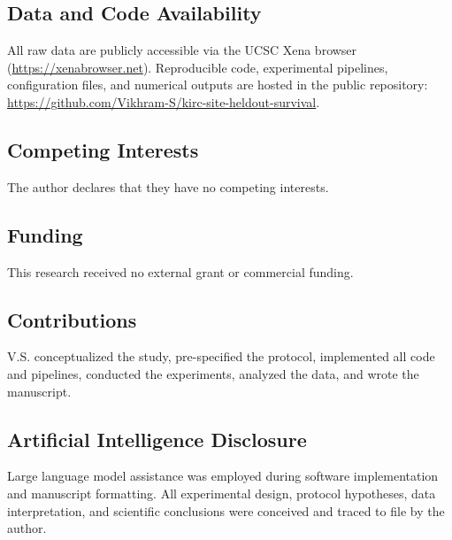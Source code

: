 \documentclass{article}
\begin{document}
\subsection*{Data and Code Availability}
All raw data are publicly accessible via the UCSC Xena browser (\url{https://xenabrowser.net}). Reproducible code, experimental pipelines, configuration files, and numerical outputs are hosted in the public repository: \url{https://github.com/Vikhram-S/kirc-site-heldout-survival}.

\subsection*{Competing Interests}
The author declares that they have no competing interests.

\subsection*{Funding}
This research received no external grant or commercial funding.

\subsection*{Contributions}
V.S. conceptualized the study, pre-specified the protocol, implemented all code and pipelines, conducted the experiments, analyzed the data, and wrote the manuscript.

\subsection*{Artificial Intelligence Disclosure}
Large language model assistance was employed during software implementation and manuscript formatting. All experimental design, protocol hypotheses, data interpretation, and scientific conclusions were conceived and traced to file by the author.



\end{document}

